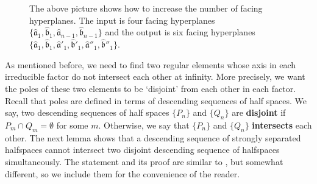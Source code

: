 \documentclass{amsart}
\theoremstyle{definition}
\newtheorem*{Notation warning}{Warning on notations}
\newtheorem*{Sketch of proof}{Sketch of proof for Theorem C}
\newcommand{\hA}{\hat{\mathfrak a}}
\newcommand{\hB}{\hat{\mathfrak b}}
\begin{document}
\begin{sloppypar}
\begin{figure}[htp]
\caption{The above picture shows how to increase the number of facing hyperplanes. The input is four facing hyperplanes $\{\hA_1,\hB_1,\hA_{n-1},\hB_{n-1}\}$ and the output is six facing hyperplanes $\{\hA_1,\hB_1,\hA'_1,\hB'_1, \hA''_1,\hB''_1\}$.}
\end{figure}


As mentioned before, we need to find two regular elements whose axis in each irreducible factor do not intersect each other at infinity.
More precisely, we want the poles of these two elements to be `disjoint' from each other in each factor.  
Recall that poles are defined in terms of descending sequences of half spaces.
We say, two descending sequences of half spaces $\{P_n\}$ and $\{Q_n\}$ are \textbf{disjoint} if $P_m\cap Q_m=\emptyset$ for some $m$.
Otherwise, we say that $\{P_n\}$ and $\{Q_n\}$  \textbf{intersects} each other.
The next lemma shows that a descending sequence of strongly separated halfspaces cannot intersect two disjoint descending sequence of halfspaces simultaneously.
The statement and its proof are similar to \cite[Lemma 5.11]{Fernos2016Random}, but somewhat different, so we include them for the convenience of the reader.


\end{sloppypar}
\end{document}
